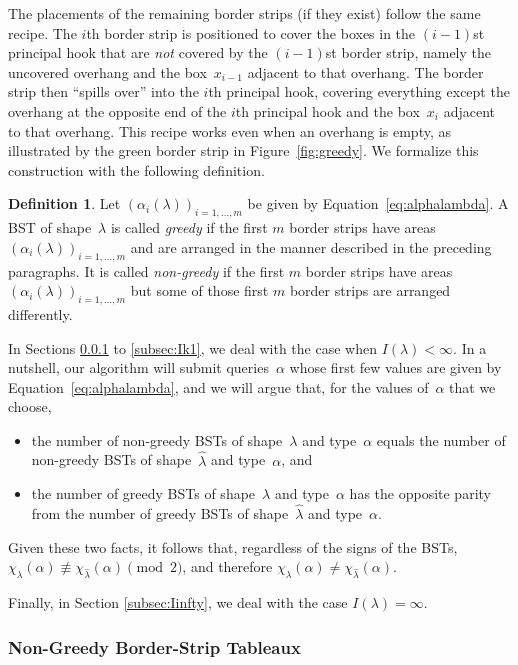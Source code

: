\documentclass[12pt]{article}
\theoremstyle{definition}
\newtheorem{definition}{Definition}
\begin{document}
The placements of the remaining border strips
(if they exist) follow the same recipe.  The $i$th border
strip is positioned to cover the boxes in the $(i-1)$st
principal hook that are \emph{not} covered by the
$(i-1)$st border strip, namely the uncovered overhang
and the box~$x_{i-1}$ adjacent to that overhang.
The border strip then ``spills over'' into the $i$th
principal hook, covering everything except the overhang
at the opposite end of the $i$th principal hook and
the box~$x_i$ adjacent to that overhang.  This recipe works
even when an overhang is empty, as illustrated by
the green border strip in Figure~\ref{fig:greedy}.
We formalize this construction with the following definition.

\begin{definition}
Let $(\alpha_i(\lambda))_{i=1,\ldots,m}$ be
given by Equation~\eqref{eq:alphalambda}.
A BST of shape~$\lambda$
is called \emph{greedy} if the first $m$ border strips
have areas $(\alpha_i(\lambda))_{i=1,\ldots,m}$ and
are arranged in the manner described in the preceding paragraphs.
It is called \emph{non-greedy} if the first $m$ border strips
have areas $(\alpha_i(\lambda))_{i=1,\ldots,m}$ but
some of those first $m$ border strips are arranged differently.
\end{definition}


In Sections \ref{subsec:nongreedy} to \ref{subsec:Ik1},
we deal with the case when $I(\lambda) < \infty$.
In a nutshell, our algorithm will submit queries~$\alpha$
whose first few values are given by Equation~\eqref{eq:alphalambda},
and we will argue that, for the values of~$\alpha$ that we choose,
\begin{itemize}
\item 
the number of non-greedy BSTs of shape~$\lambda$
and type~$\alpha$
equals the number of non-greedy BSTs of shape~$\hat\lambda$
and type~$\alpha$, and
\item 
the number of greedy BSTs of shape~$\lambda$ and type~$\alpha$
has the opposite parity from 
the number of greedy BSTs of shape~$\hat\lambda$ and type~$\alpha$.
\end{itemize}
Given these two facts, it follows that,
regardless of the signs of the BSTs,
$\chi_\lambda(\alpha) \not\equiv \chi_{\hat\lambda}(\alpha) \pmod 2$,
and therefore
$\chi_\lambda(\alpha) \ne \chi_{\hat\lambda}(\alpha)$.


Finally, in Section \ref{subsec:Iinfty}, we deal with
the case $I(\lambda)=\infty$.

\subsubsection{Non-Greedy Border-Strip Tableaux}
\label{subsec:nongreedy}
\end{document}

